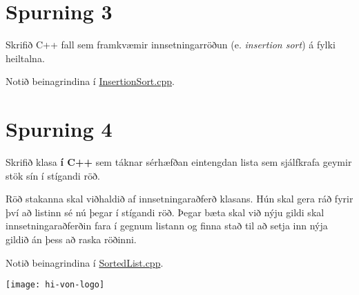 \documentclass{article}
\begin{document}
\section{Spurning 3}
Skrifið C++ fall sem framkvæmir innsetningarröðun (e. \emph{insertion sort}) á fylki heiltalna.

Notið beinagrindina í  \href{https://raw.githubusercontent.com/Ernir/kennsluefni/master/T2/Code/w6/InsertionSort.cpp}{InsertionSort.cpp}.
\section{Spurning 4}
Skrifið klasa \textbf{í C++} sem táknar sérhæfðan eintengdan lista sem sjálfkrafa geymir stök sín í stígandi röð.

Röð stakanna skal viðhaldið af innsetningaraðferð klasans. Hún skal gera ráð fyrir því að listinn sé nú þegar í stígandi röð. Þegar bæta skal við nýju gildi skal innsetningaraðferðin fara í gegnum listann og finna stað til að setja inn nýja gildið án þess að raska röðinni.

Notið beinagrindina í  \href{https://raw.githubusercontent.com/Ernir/kennsluefni/master/T2/Code/w6/SortedList.cpp}{SortedList.cpp}.

\vfill
\texttt{[image: hi-von-logo]}
\end{document}
